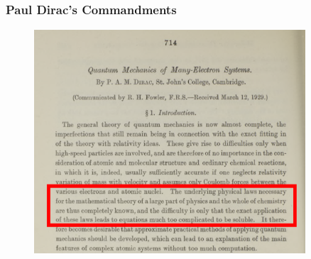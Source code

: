 \documentclass[cjk,slidestop,handout,compress,mathserif,blue]{beamer}	%
\newcommand{\upcite}[1]{\hspace{0ex}\textsuperscript{\cite{#1}}} %
\begin{document}
\frame
{
	\frametitle{\rm{Paul Dirac's Commandments\upcite{PRSLSA123-714_1929}}}
\begin{figure}[h!]
\centering
\vspace{-10.5pt}
\includegraphics[height=0.71\textwidth,width=0.9\textwidth,viewport=0 0 1150 920,clip]{Figures/Dirac_comment.png}
\label{Diract_Commandment}
\end{figure}
}
\end{document}
